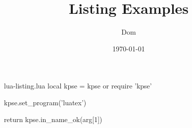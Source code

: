 \begin{filecontents}[noheader]{lua-listing.lua}
local kpse = kpse or require 'kpse'

kpse.set_program('luatex')

return kpse.in_name_ok(arg[1])
\end{filecontents}

\documentclass{article}

\usepackage{listings}

\title{Listing Examples}
\author{Dom}
\date{\today}




    \section{\LaTeX\ code}

    Testing \verb|| with the Lua language.

    Lua}]{lua-listing.lua}

    Testing a \texttt{caption}.

    Lua},caption={The Lua file}]{lua-listing.lua}

    Testing a upper \texttt{caption}.

    Lua},caption={The Lua file},captionpos=b]{lua-listing.lua}


